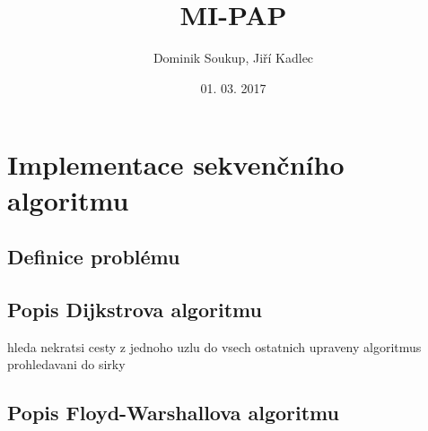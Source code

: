 \documentclass[a4paper,11pt]{article}
\title{\textbf{MI-PAP}}
\author{Dominik Soukup, Jiří Kadlec}
\date{01. 03. 2017}
\begin{document}
\maketitle
\thispagestyle{empty}
\newpage
\tableofcontents
\thispagestyle{empty}
\newpage


\section{Implementace sekvenčního algoritmu}
\subsection{Definice problému}

\subsection{Popis Dijkstrova algoritmu}
hleda nekratsi cesty z jednoho uzlu do vsech ostatnich
upraveny algoritmus prohledavani do sirky


\subsection{Popis Floyd-Warshallova algoritmu}
\end{document}
